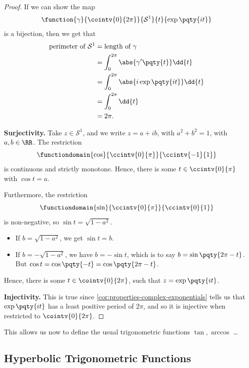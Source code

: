 \begin{proof}
    If we can show the map
    \[
        \function{\gamma}{\cointv{0}{2\pi}}{\mathcal{S}^1}{t}{\exp \pqty{it}}
    \]
    is a bijection, then we get that
    \begin{align*}
        \text{perimeter of }\mathcal{S}^1 &= \text{length of }\gamma \\
        &= \int_{0}^{2 \pi} \abs{\gamma' \pqty{t}} \dd{t} \\
        &= \int_{0}^{2 \pi} \abs{i \exp \pqty{it}} \dd{t} \\
        &= \int_{0}^{2 \pi} \dd{t} \\
        &= 2 \pi.
    \end{align*}

    \textbf{Surjectivity.} Take \(z \in \mathcal{S}^1\), and we write \(z = a + ib\), with \(a^2 + b^2 = 1\), with \(a, b \in \RR\). The restriction
    \[
        \functiondomain{\cos}{\ccintv{0}{\pi}}{\ccintv{-1}{1}}
    \]
    is continuous and strictly monotone. Hence, there is some \(t \in \ccintv{0}{\pi}\) with \(\cos t = a\).

    Furthermore, the restriction
    \[
        \functiondomain{\sin}{\ccintv{0}{\pi}}{\ccintv{0}{1}}
    \]
    is non-negative, so \(\sin t = \sqrt{1 - a^2}\).
    
    \begin{itemize}
        \item If \(b = \sqrt{1 - a^2}\), we get \(\sin t = b\).
        \item If \(b = - \sqrt{1 - a^2}\), we have \(b = - \sin t\), which is to say \(b = \sin \pqty{2 \pi - t}\). But \(\cos t = \cos \pqty{-t} = \cos \pqty{2\pi - t}\).
    \end{itemize}

    Hence, there is some \(t \in \cointv{0}{2\pi}\), such that \(z = \exp \pqty{it}\).

    \textbf{Injectivity.} This is true since \autoref{cor:properties-complex-exponentials} tells us that \(\exp\pqty{it}\) has a least positive period of \(2 \pi\), and so it is injective when restricted to \(\cointv{0}{2\pi}\).
\end{proof}

This allows us now to define the usual trigonometric functions \(\tan, \arccos\) \dots

\subsection{Hyperbolic Trigonometric Functions}

